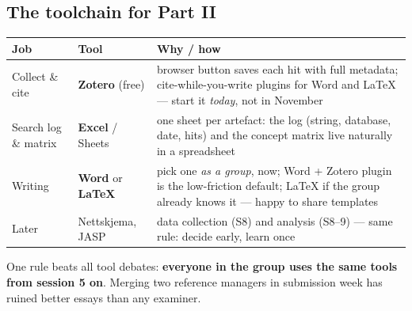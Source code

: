 \documentclass[11pt,a4paper,british,twoside=false,headings=small,chapterprefix=false,numbers=noenddot]{scrbook}
\begin{document}
\subsection{The toolchain for Part II}
\begin{center}\small
\footnotesize
  \renewcommand{\arraystretch}{1.35}
  \begin{tabular}{@{}p{2.8cm}p{3.4cm}p{6.6cm}@{}}
    \toprule
    \textbf{Job} & \textbf{Tool} & \textbf{Why / how}\\
    \midrule
    Collect \& cite & \textbf{Zotero} (free) & browser button saves each hit with full metadata; cite-while-you-write plugins for Word and LaTeX --- start it \emph{today}, not in November\\
    Search log \& matrix & \textbf{Excel} / Sheets & one sheet per artefact: the log (string, database, date, hits) and the concept matrix live naturally in a spreadsheet\\
    Writing & \textbf{Word} or \textbf{LaTeX} & pick one \emph{as a group}, now; Word + Zotero plugin is the low-friction default; LaTeX if the group already knows it --- happy to share templates\\
    Later & Nettskjema, JASP & data collection (S8) and analysis (S8--9) --- same rule: decide early, learn once\\
    \bottomrule
  \end{tabular}
  

  One rule beats all tool debates: \textbf{everyone in the group uses the
  same tools from session 5 on}. Merging two reference managers in submission
  week has ruined better essays than any examiner.
\end{center}
\end{document}
